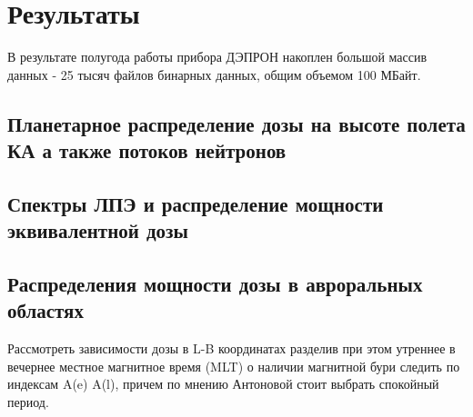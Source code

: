 
\chapter{Результаты}\label{chapt_results}
В результате полугода работы прибора ДЭПРОН накоплен большой массив данных - 25 тысяч файлов бинарных данных, общим объемом 100 МБайт.


\section{Планетарное распределение дозы на высоте полета КА а также потоков нейтронов}

\section{Спектры ЛПЭ и распределение мощности эквивалентной дозы}


\section{Распределения мощности дозы в авроральных областях}

Рассмотреть зависимости дозы в L-B координатах разделив при этом утреннее в вечернее местное магнитное время (MLT) о наличии магнитной бури следить по индексам A(e) A(l), причем по мнению Антоновой стоит выбрать спокойный период.